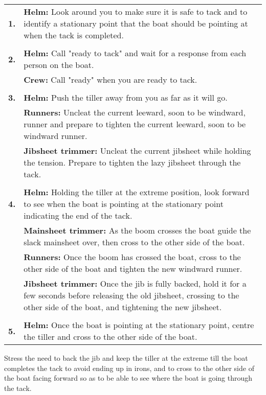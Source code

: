 \documentclass[12pt]{scrartcl}
\begin{document}
\label{tab:tacking drill}
\begin{tabularx}{420pt}{lX}
	\centering
	\textbf{1.} & \textbf{Helm:} Look around you to make sure it is safe to tack and to identify a stationary point that the boat should be pointing at when the tack is completed. \\
	& \\
	\textbf{2.} & \textbf{Helm:} Call "ready to tack" and wait for a response from each person on the boat. \\
	& \textbf{Crew:} Call "ready" when you are ready to tack. \\
	& \\
	\textbf{3.} & \textbf{Helm:} Push the tiller away from you as far as it will go. \\
	& \textbf{Runners:} Uncleat the current leeward, soon to be windward, runner and prepare to tighten the current leeward, soon to be windward runner. \\
	& \textbf{Jibsheet trimmer:} Uncleat the current jibsheet while holding the tension. Prepare to tighten the lazy jibsheet through the tack. \\
	& \\
	\textbf{4.} & \textbf{Helm:} Holding the tiller at the extreme position, look forward to see when the boat is pointing at the stationary point indicating the end of the tack. \\
	& \textbf{Mainsheet trimmer:} As the boom crosses the boat guide the slack mainsheet over, then cross to the other side of the boat. \\
	& \textbf{Runners:} Once the boom has crossed the boat, cross to the other side of the boat and tighten the new windward runner. \\
	& \textbf{Jibsheet trimmer:} Once the jib is fully backed, hold it for a few seconds before releasing the old jibsheet, crossing to the other side of the boat, and tightening the new jibsheet. \\
	& \\
	\textbf{5.} & \textbf{Helm:} Once the boat is pointing at the stationary point, centre the tiller and cross to the other side of the boat. \\
\end{tabularx}

Stress the need to back the jib and keep the tiller at the extreme till the boat completes the tack to avoid ending up in irons, and to cross to the other side of the boat facing forward so as to be able to see where the boat is going through the tack.
\end{document}
